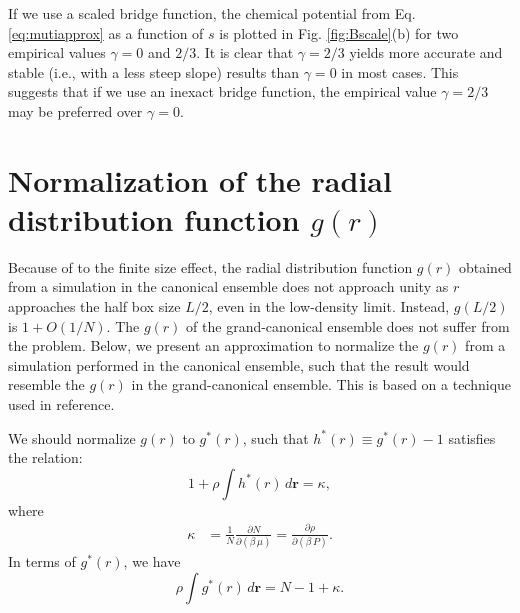 \documentclass[preprint]{revtex4-1}
\newcommand{\vct}[1]{\mathbf{#1}}
\providecommand{\vr}{} %
\renewcommand{\vr}{\vct{r}}
\begin{document}
If we use a scaled bridge function,
the chemical potential from Eq. \eqref{eq:mutiapprox}
as a function of $s$ is plotted in Fig. \ref{fig:Bscale}(b)
for two empirical values $\gamma = 0$ and $2/3$.
%
It is clear that $\gamma = 2/3$ yields
more accurate and stable (i.e., with a less steep slope) results
than $\gamma = 0$ in most cases.
%
This suggests that
if we use an inexact bridge function,
the empirical value $\gamma = 2/3$
may be preferred over $\gamma = 0$.



\appendix

\section{\label{apd:canonscaling}
Normalization of the radial distribution function $g(r)$}

Because of to the finite size effect,
the radial distribution function $g(r)$
obtained from a simulation in the canonical ensemble
does not approach unity as $r$ approaches the half box size $L/2$,
even in the low-density limit.
Instead, $g(L/2)$ is $1 + O(1/N)$.
%
The $g(r)$ of the grand-canonical ensemble does not suffer from the problem.
%
Below, we present an approximation to normalize the $g(r)$
from a simulation performed in the canonical ensemble,
such that the result would resemble the $g(r)$ in the grand-canonical ensemble.
%
This is based on a technique used in reference\cite{kolafa2002}.


We should normalize $g(r)$ to $g^*(r)$,
such that $h^*(r) \equiv g^*(r) - 1$ satisfies the relation:
\begin{equation}
  1 + \rho \int h^*(r) \, d\vr= \kappa,
  \label{eq:hint}
\end{equation}
where
\begin{align*}
  \kappa
&=
  \frac{1}{N}
  \frac { \partial N }
  { \partial (\beta \, \mu) }
= \frac { \partial \rho }
        { \partial (\beta \, P) }.
\end{align*}
In terms of $g^*(r)$, we have
\[
  \rho \int g^*(r) \, d\vr = N - 1 + \kappa.
\]
\end{document}
